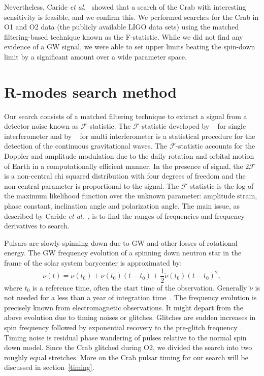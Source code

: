 \documentclass{ttuthes2007}
\begin{document}
Nevertheless, Caride \textit{et al.}~\cite{PhysRevD.100.064013} showed that a search of
the Crab with interesting sensitivity is feasible, and we confirm this.
We performed searches for the Crab in  \ac{O1} and \ac{O2} data (the publicly
available LIGO data sets) using the matched filtering-based technique known as
the F-statistic.
While we did not find any evidence of a \ac{GW} signal, we were able to set
upper limits beating the spin-down limit by a significant amount over a wide
parameter space.

\section{R-modes search method} 

Our search consists of a matched filtering technique to extract a signal from a
detector noise known as $\mathcal{F}$-statistic. The $\mathcal{F}$-statistic
developed by ~\cite{Jaranowski_1998} for single interferometer and by
~\citet{PhysRevD.72.063006} for multi interferometer is a statistical procedure
for the detection of the continuous gravitational waves. The
$\mathcal{F}$-statistic accounts for the Doppler and amplitude modulation due
to the daily rotation and orbital motion of Earth in a computationally efficient
manner. In the presence of signal,
the $2\mathcal{F}$ is a non-central chi squared distribution with four degrees
of freedom and the non-central parameter is proportional to the signal. The
$\mathcal{F}$-statistic is the log of the maximum likelihood function over the
unknown parameter: amplitude strain, phase constant, inclination angle and
polarization angle. 
The main issue, as described by Caride \textit{et al.}~\cite{PhysRevD.100.064013}, is to
find the ranges of frequencies and frequency derivatives to search.

Pulsars are slowly spinning down due to \ac{GW} and other losses of rotational
energy. The \ac{GW} frequency evolution of a spinning down neutron star in the
frame of the solar system barycenter is approximated by: 
\begin{equation}
 \nu(t) = \nu\left( t_0 \right) + \dot{\nu}\left( t_0 \right) \left( t-t_0
\right) + \frac{1}{2} \ddot{\nu}\left( t_0 \right) \left( t-t_0 \right)^2,
\end{equation} 
where $t_0$ is a reference time, often the start time of the observation.
Generally $\dddot{\nu}$ is not needed for a less than a year of integration
time~\cite{PhysRevD.100.064013}. The frequency evolution is precisely known from
electromagnetic observations. It might depart from the above evolution due to
timing noises or glitches. Glitches are sudden increases in spin frequency
followed by exponential recovery to the pre-glitch
frequency~\cite{Espinoza_2011}. Timing noise is residual phase wandering of
pulses
relative to the normal spin down model.
Since the Crab glitched during O2, we divided the search into two roughly equal
stretches. More on the Crab pulsar timing for our search will be discussed in
section~\ref{timing}.
\end{document}
